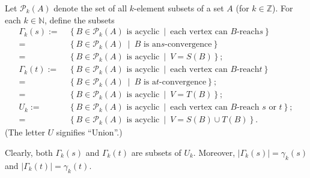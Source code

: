 \documentclass[numbers=enddot,12pt,final,onecolumn,notitlepage]{scrartcl}%
\theoremstyle{definition}
\theoremstyle{plainsl}
\begin{document}
Let $\mathcal{P}_{k}\left(  A\right)  $ denote the set of all $k$-element
subsets of a set $A$ (for $k\in\mathbb{Z}$). For each $k\in\mathbb{N}$, define
the subsets
\begin{align*}
\Gamma_{k}\left(  s\right)  :=  &  \ \left\{  B\in\mathcal{P}_{k}\left(
A\right)  \text{ is acyclic}\ \mid\ \text{each vertex can }B\text{-reach
}s\right\} \\
=  &  \ \left\{  B\in\mathcal{P}_{k}\left(  A\right)  \ \mid\ B\text{ is an
}s\text{-convergence}\right\} \\
=  &  \ \left\{  B\in\mathcal{P}_{k}\left(  A\right)  \text{ is acyclic}
\ \mid\ V=S\left(
B\right)  \right\}  ;\\
\Gamma_{k}\left(  t\right)  :=  &  \ \left\{  B\in\mathcal{P}_{k}\left(
A\right)  \text{ is acyclic}\ \mid\ \text{each vertex can }B\text{-reach
}t\right\} \\
=  &  \ \left\{  B\in\mathcal{P}_{k}\left(  A\right)  \ \mid\ B\text{ is a
}t\text{-convergence}\right\}  ;\\
=  &  \ \left\{  B\in\mathcal{P}_{k}\left(  A\right)  \text{ is acyclic}
\ \mid\ V=T\left(
B\right)  \right\}  ;\\
U_{k}:=  &  \ \left\{  B\in\mathcal{P}_{k}\left(  A\right)  \text{ is
acyclic}\ \mid\ \text{each vertex can }B\text{-reach }s\text{ or }t\right\}
;\\
=  &  \ \left\{  B\in\mathcal{P}_{k}\left(  A\right)  \text{ is acyclic}
\ \mid\ V=S\left(
B\right)  \cup T\left(  B\right)  \right\} .
\end{align*}
(The letter $U$ signifies \textquotedblleft Union\textquotedblright.)


Clearly, both $\Gamma_{k}\left(  s\right)  $ and $\Gamma_{k}\left(  t\right)
$ are subsets of $U_{k}$. Moreover, $\left\vert \Gamma_{k}\left(  s\right)
\right\vert =\gamma_{k}\left(  s\right)  $ and $\left\vert \Gamma_{k}\left(
t\right)  \right\vert =\gamma_{k}\left(  t\right)  $.
\end{document}
